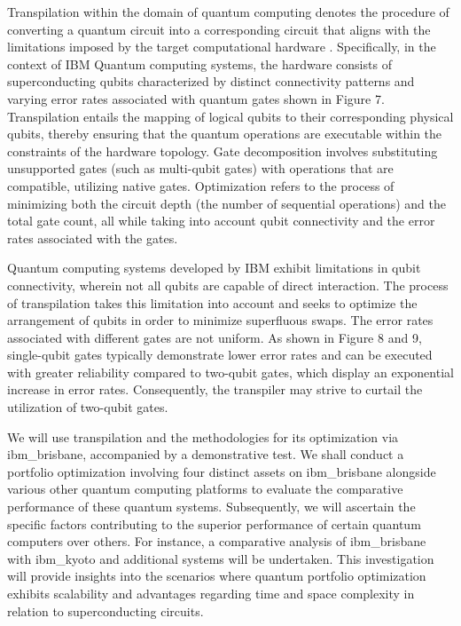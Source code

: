 \documentclass[%
 reprint,
 amsmath,amssymb,
 aps,
]{revtex4-2}
\begin{document}
Transpilation within the domain of quantum computing denotes the procedure of converting a quantum circuit into a corresponding circuit that aligns with the limitations imposed by the target computational hardware \cite{Moll2018}. Specifically, in the context of IBM Quantum computing systems, the hardware consists of superconducting qubits characterized by distinct connectivity patterns and varying error rates associated with quantum gates shown in Figure 7. Transpilation entails the mapping of logical qubits to their corresponding physical qubits, thereby ensuring that the quantum operations are executable within the constraints of the hardware topology. Gate decomposition involves substituting unsupported gates (such as multi-qubit gates) with operations that are compatible, utilizing native gates. Optimization refers to the process of minimizing both the circuit depth (the number of sequential operations) and the total gate count, all while taking into account qubit connectivity and the error rates associated with the gates.

Quantum computing systems developed by IBM exhibit limitations in qubit connectivity, wherein not all qubits are capable of direct interaction. The process of transpilation takes this limitation into account and seeks to optimize the arrangement of qubits in order to minimize superfluous swaps. The error rates associated with different gates are not uniform. As shown in Figure 8 and 9, single-qubit gates typically demonstrate lower error rates and can be executed with greater reliability compared to two-qubit gates, which display an exponential increase in error rates. Consequently, the transpiler may strive to curtail the utilization of two-qubit gates.

We will use transpilation and the methodologies for its optimization via ibm\_brisbane, accompanied by a demonstrative test. We shall conduct a portfolio optimization involving four distinct assets on ibm\_brisbane alongside various other quantum computing platforms to evaluate the comparative performance of these quantum systems. Subsequently, we will ascertain the specific factors contributing to the superior performance of certain quantum computers over others. For instance, a comparative analysis of ibm\_brisbane with ibm\_kyoto and additional systems will be undertaken. This investigation will provide insights into the scenarios where quantum portfolio optimization exhibits scalability and advantages regarding time and space complexity in relation to superconducting circuits.
\end{document}
